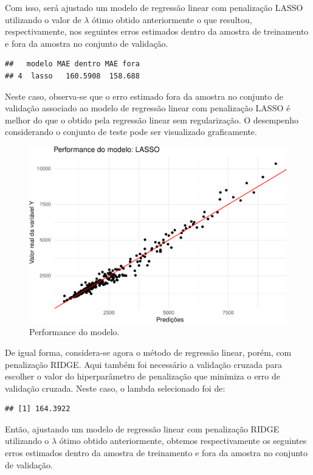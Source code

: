 \documentclass[11pt,]{article}
\begin{document}
\noindent Com isso, será ajustado um modelo de regressão linear com
penalização LASSO utilizando o valor de \(\lambda\) ótimo obtido
anteriormente o que resultou, respectivamente, nos seguintes erros
estimados dentro da amostra de treinamento e fora da amostra no conjunto
de validação.

\begin{verbatim}
##   modelo MAE dentro MAE fora
## 4  lasso   160.5908  158.688
\end{verbatim}

Neste caso, observa-se que o erro estimado fora da amostra no conjunto
de validação associado ao modelo de regressão linear com penalização
LASSO é melhor do que o obtido pela regressão linear sem regularização.
O desempenho considerando o conjunto de teste pode ser visualizado
graficamente.

\begin{figure}

{\centering \includegraphics[width=0.6\linewidth]{figs/unnamed-chunk-11} 

}

\caption{Performance do modelo.}\label{fig:unnamed-chunk-11}
\end{figure}

De igual forma, considera-se agora o método de regressão linear, porém,
com penalização RIDGE. Aqui também foi necessário a validação cruzada
para escolher o valor do hiperparâmetro de penalização que minimiza o
erro de validação cruzada. Neste caso, o lambda selecionado foi de:

\begin{verbatim}
## [1] 164.3922
\end{verbatim}

\noindent Então, ajustando um modelo de regressão linear com penalização
RIDGE utilizando o \(\lambda\) ótimo obtido anteriormente, obtemos
respectivamente os seguintes erros estimados dentro da amostra de
treinamento e fora da amostra no conjunto de validação.
\end{document}
